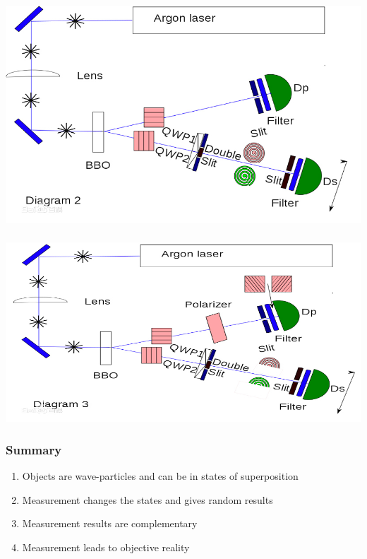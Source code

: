 \begin{frame}
    \frametitle{}
    \begin{center}
        \includegraphics[width=1.0\textwidth]{figs/chachuexp_2.png} \\
    \end{center} 
\end{frame}

\begin{frame}
    \frametitle{}
    \begin{center}
        \includegraphics[width=1.0\textwidth]{figs/chachuexp_3.png} \\
    \end{center} 
\end{frame}

\begin{frame}
    \frametitle{Summary}
    \begin{enumerate}
        \item Objects are wave-particles and can be in states of superposition
        \item Measurement changes the states and gives random results
        \item Measurement results are complementary
        \item Measurement leads to objective reality
    \end{enumerate}
\end{frame}

